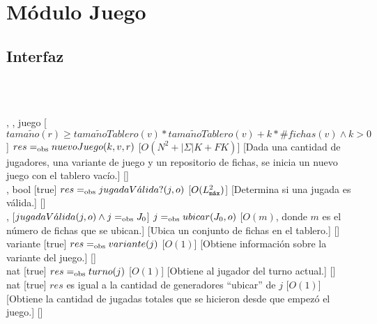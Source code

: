 \section{Módulo Juego}
\begin{interfaz}{\subsection{Interfaz}}
  \\\\
  \usa{\falta}
  \par\noindent
  \begin{operaciones}
    {, , }{juego}
    [$tama\tilde{n}o(r)\geq tama\tilde{n}oTablero(v)*tama\tilde{n}oTablero(v)+k*\#fichas(v)\land k>0$]
    {$res \igobs nuevoJuego(k,v,r)$}
    [$O(N^{2}+|\Sigma|K+FK)$]
    [Dada una cantidad de jugadores, una variante de juego y un repositorio de fichas, se inicia un nuevo juego con el tablero vacío.]
    [\falta]\\

    \noindent{}
    {, }{bool}
    [true]
    {$res\igobs jugadaV\acute{a}lida?(j,o)$}
    [$O(\Lmax^{2})$]
    [Determina si una jugada es válida.]
    [\falta]\\

    \noindent{}
    {, }{}
    [$jugadaV\acute{a}lida(j,o) \land j\igobs J_{0} $]
    {$j\igobs ubicar(J_{0},o)$}
    [$O(m)$, donde $m$ es el número de fichas que se ubican.]
    [Ubica un conjunto de fichas en el tablero.]
    [\falta]\\

    \noindent{}
    {}{variante}
    [true]
    {$res\igobs variante(j)$}
    [$O(1)$]
    [Obtiene información sobre la variante del juego.]
    [\falta]\\

    \noindent{}
    {}{nat}
    [true]
    {$res\igobs turno(j)$}
    [$O(1)$]
    [Obtiene al jugador del turno actual.]
    [\falta]\\

    \noindent{}
    {}{nat}
    [true]
    {$res$ es igual a la cantidad de generadores ``ubicar'' de $j$}
    [$O(1)$]
    [Obtiene la cantidad de jugadas totales que se hicieron desde que empezó el juego.]
    [\falta]\\


\end{operaciones}
\end{interfaz}

